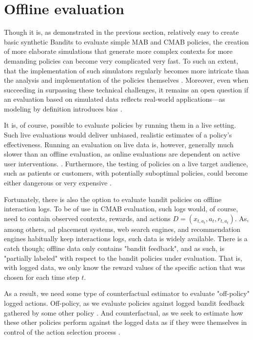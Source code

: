 \documentclass{jss}
\begin{document}
\section{Offline evaluation} \label{offl}

Though it is, as demonstrated in the previous section, relatively easy to create basic synthetic Bandits to evaluate simple MAB and CMAB policies, the creation of more elaborate simulations that generate more complex contexts for more demanding policies can become very complicated very fast. To such an extent, that the implementation of such simulators regularly becomes more intricate than the analysis and implementation of the policies themselves \citep{Strehl2006a}. Moreover, even when succeeding in surpassing these technical challenges, it remains an open question if an evaluation based on simulated data reflects real-world applications---as modeling by definition introduces bias \citep{Li2012,Li2011}.

It is, of course, possible to evaluate policies by running them in a live setting. Such live evaluations would deliver unbiased, realistic estimates of a policy's effectiveness. Running an evaluation on live data is, however, generally much slower than an offline evaluation, as online evaluations are dependent on active user interventions. \citep{Mandel2016, Tewari2017}. Furthermore, the testing of policies on a live target audience, such as patients or customers, with potentially suboptimal policies, could become either dangerous or very expensive \citep{Bastani2015}.

Fortunately, there is also the option to evaluate bandit policies on offline interaction logs. To be of use in CMAB evaluation, such logs would, of course, need to contain observed contexts, rewards, and actions \( D = (x_{t,a_t},a_{t},r_{t,a_t}) \). As, among others, ad placement systems, web search engines, and recommendation engines habitually keep interactions logs, such data is widely available. There is a catch though; offline data only contains "bandit feedback", and as such, is "partially labeled" with respect to the bandit policies under evaluation\citep{Strehl2010}. That is, with logged data, we only know the reward values of the specific action that was chosen for each time step $t$.

As a result, we need some type of counterfactual estimator to evaluate "off-policy" logged actions. Off-policy, as we evaluate policies against logged bandit feedback gathered by some other policy \citep{Li2012,Li2011}. And counterfactual, as we seek to estimate how these other policies perform against the logged data as if they were themselves in control of the action selection process \citep{Bottou2013,Swaminathan2015}.
\end{document}
